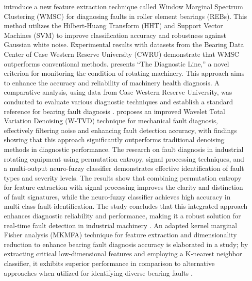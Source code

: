 \documentclass[sn-basic,pdflatex]{sn-jnl}
\theoremstyle{remark}
\theoremstyle{definition}
\begin{document}
\citet{WOS:000365686400021} introduce a new feature extraction technique
called Window Marginal Spectrum Clustering (WMSC) for diagnosing faults
in roller element bearings (REBs). This method utilizes the
Hilbert-Huang Transform (HHT) and Support Vector Machines (SVM) to
improve classification accuracy and robustness against Gaussian white
noise. Experimental results with datasets from the Bearing Data Center
of Case Western Reserve University (CWRU) demonstrate that WMSC
outperforms conventional methods. \citet{WOS:000366534900022} presents
``The Diagnostic Line,'' a novel criterion for monitoring the condition
of rotating machinery. This approach aims to enhance the accuracy and
reliability of machinery health diagnosis. A comparative analysis, using
data from Case Western Reserve University, was conducted to evaluate
various diagnostic techniques and establish a standard reference for
bearing fault diagnosis \citep{WOS:000357230900007}.
\citet{WOS:000385104500001} proposes an improved Wavelet Total Variation
Denoising (W-TVD) technique for mechanical fault diagnosis, effectively
filtering noise and enhancing fault detection accuracy, with findings
showing that this approach significantly outperforms traditional
denoising methods in diagnostic performance. The research on fault
diagnosis in industrial rotating equipment using permutation entropy,
signal processing techniques, and a multi-output neuro-fuzzy classifier
demonstrates effective identification of fault types and severity
levels. The results show that combining permutation entropy for feature
extraction with signal processing improves the clarity and distinction
of fault signatures, while the neuro-fuzzy classifier achieves high
accuracy in multi-class fault identification. The study concludes that
this integrated approach enhances diagnostic reliability and
performance, making it a robust solution for real-time fault detection
in industrial machinery \citep{Rajabi2022}. An adapted kernel marginal
Fisher analysis (MKMFA) technique for feature extraction and
dimensionality reduction to enhance bearing fault diagnosis accuracy is
elaborated in a study; by extracting critical low-dimensional features
and employing a K-nearest neighbor classifier, it exhibits superior
performance in comparison to alternative approaches when utilized for
identifying diverse bearing faults \citep{WOS:000392016300001}.
\end{document}
